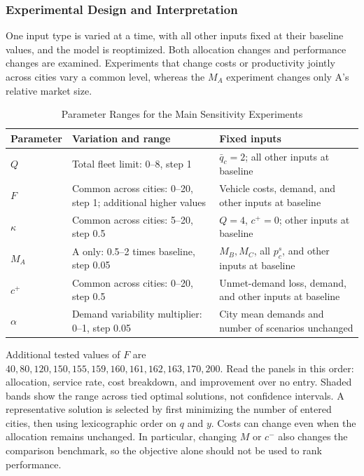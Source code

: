 \documentclass[10pt,a4paper]{article}
\begin{document}
\subsubsection{Experimental Design and Interpretation}
One input type is varied at a time, with all other inputs fixed at their baseline values, and the model is reoptimized. Both allocation changes and performance changes are examined. Experiments that change costs or productivity jointly across cities vary a common level, whereas the $M_A$ experiment changes only A's relative market size.
\begin{table}[H]
\centering\small
\caption{Parameter Ranges for the Main Sensitivity Experiments}\label{tab:sc-sensitivity-design}
\begin{tabular}{lP{.48\linewidth}P{.35\linewidth}}
\toprule
Parameter & Variation and range & Fixed inputs\\\midrule
$Q$ & Total fleet limit: 0--8, step 1 & $\bar q_c=2$; all other inputs at baseline\\
$F$ & Common across cities: 0--20, step 1; additional higher values & Vehicle costs, demand, and other inputs at baseline\\
$\kappa$ & Common across cities: 5--20, step 0.5 & $Q=4$, $c^+=0$; other inputs at baseline\\
$M_A$ & A only: 0.5--2 times baseline, step 0.05 & $M_B,M_C$, all $p_c^s$, and other inputs at baseline\\
$c^+$ & Common across cities: 0--20, step 0.5 & Unmet-demand loss, demand, and other inputs at baseline\\
$\alpha$ & Demand variability multiplier: 0--1, step 0.05 & City mean demands and number of scenarios unchanged\\
\bottomrule
\end{tabular}
\end{table}
Additional tested values of $F$ are $40,80,120,150,155,159,160,161,162,163,170,200$. Read the panels in this order: allocation, service rate, cost breakdown, and improvement over no entry. Shaded bands show the range across tied optimal solutions, not confidence intervals. A representative solution is selected by first minimizing the number of entered cities, then using lexicographic order on $q$ and $y$. Costs can change even when the allocation remains unchanged. In particular, changing $M$ or $c^-$ also changes the comparison benchmark, so the objective alone should not be used to rank performance.
\end{document}

